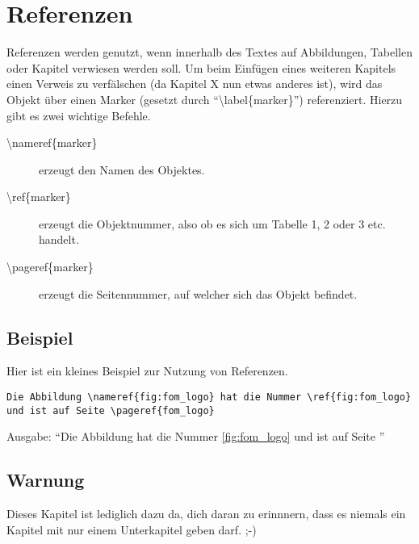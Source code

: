 \chapter{Referenzen}
\label{ch:referenzen}
Referenzen werden genutzt, wenn innerhalb des Textes auf Abbildungen, Tabellen oder Kapitel verwiesen werden soll. Um beim Einfügen eines weiteren Kapitels einen Verweis zu verfälschen (da Kapitel X nun etwas anderes ist), wird das Objekt über einen Marker (gesetzt durch \enquote{\textbackslash label\{marker\}}) referenziert. Hierzu gibt es zwei wichtige Befehle.
\begin{description}
\item[{\textbackslash nameref\{marker\}}] erzeugt den Namen des Objektes.
\item[{\textbackslash ref\{marker\}}] erzeugt die Objektnummer, also ob es sich um Tabelle 1, 2 oder 3 etc. handelt.
\item[{\textbackslash pageref\{marker\}}] erzeugt die Seitennummer, auf welcher sich das Objekt befindet.
\end{description}

\section{Beispiel}
Hier ist ein kleines Beispiel zur Nutzung von Referenzen.
\begin{lstlisting}
Die Abbildung \nameref{fig:fom_logo} hat die Nummer \ref{fig:fom_logo} und ist auf Seite \pageref{fom_logo}
\end{lstlisting}
Ausgabe: \enquote{Die Abbildung  hat die Nummer \ref{fig:fom_logo} und ist auf Seite \pageref{fig:fom_logo}}

\section{Warnung}
Dieses Kapitel ist lediglich dazu da, dich daran zu erinnnern, dass es niemals ein Kapitel mit nur einem Unterkapitel geben darf. ;-)